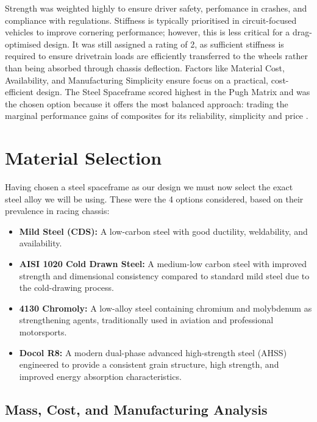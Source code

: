 Strength was weighted highly to ensure driver safety, perfomance in crashes, and compliance with regulations. Stiffness is typically prioritised in circuit-focused vehicles to improve cornering performance; however, this is less critical for a drag-optimised design. It was still assigned a rating of 2, as sufficient stiffness is required to ensure drivetrain loads are efficiently transferred to the wheels rather than being absorbed through chassis deflection. Factors like Material Cost, Availability, and Manufacturing Simplicity ensure focus on a practical, cost-efficient design. The Steel Spaceframe scored highest in the Pugh Matrix and was the chosen option because it offers the most balanced approach: trading the marginal performance gains of composites for its reliability, simplicity and price \cite{racecar_engineering_oxford_brookes} \cite{tutf_composite_build}.

\section{Material Selection}

Having chosen a steel spaceframe as our design we must now select the exact steel alloy we will be using. These were the 4 options considered, based on their prevalence in racing chassis: 
\begin{itemize}
    \item \textbf{Mild Steel (CDS):} A low-carbon steel with good ductility, weldability, 
    and availability.

    \item \textbf{AISI 1020 Cold Drawn Steel:} A medium-low carbon steel with improved 
    strength and dimensional consistency compared to standard mild steel due to the 
    cold-drawing process. 

    \item \textbf{4130 Chromoly:} A low-alloy steel containing chromium and molybdenum as 
    strengthening agents, traditionally used in aviation and professional motorsports.

    \item \textbf{Docol R8:} A modern dual-phase advanced high-strength steel (AHSS) 
    engineered to provide a consistent grain structure, high strength, and improved 
    energy absorption characteristics.
\end{itemize}
\subsection{Mass, Cost, and Manufacturing Analysis}

